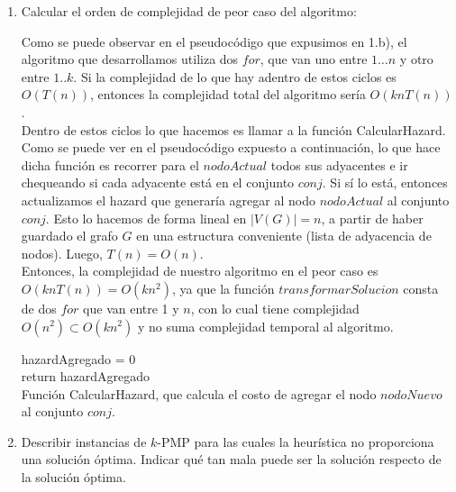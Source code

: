 \documentclass[11pt, a4paper, twoside]{article}
\begin{document}
\begin{enumerate}
		\item Calcular el orden de complejidad de peor caso del algoritmo:
		
		Como se puede observar en el pseudocódigo que expusimos en 1.b), el algoritmo que desarrollamos utiliza dos $for$, 
		que van uno entre $1 \dots n$ y otro entre $1..k$.
		Si la complejidad de lo que hay adentro de estos ciclos es $O(T(n))$, entonces la complejidad total
		del algoritmo sería $O(knT(n))$. \\
		Dentro de estos ciclos lo que hacemos es llamar a la función CalcularHazard. Como se puede ver en el pseudocódigo
		expuesto a continuación, lo que hace dicha función es
		recorrer para el $nodoActual$ todos sus adyacentes e ir chequeando si cada adyacente está en el conjunto $conj$. 
		Si sí lo está, entonces actualizamos el hazard que generaría agregar al nodo $nodoActual$ al conjunto $conj$. 
		Esto lo hacemos de forma lineal 
		en $|V(G)| = n $, a partir de haber guardado el grafo $G$ en una estructura conveniente (lista de adyacencia 
		de nodos). Luego, $T(n) = O(n)$. \\
		Entonces, la complejidad de nuestro algoritmo en el peor caso es $ O(knT(n)) = O(k n^2)$, ya que la función 
		$transformarSolucion$ consta de dos $for$ que van entre 1 y $n$, con lo cual tiene complejidad 
		$O(n^2) \subset O(k n^2) $ y no suma complejidad temporal al algoritmo.
		
		
		\begin{algorithm}[H]
		  hazardAgregado = 0 \\
		  return hazardAgregado \\
		\caption {Función CalcularHazard, que calcula el costo de agregar el nodo $nodoNuevo$ al conjunto $conj$.}
		\end{algorithm}
		
		
		\item Describir instancias de $k$-PMP para las cuales la heurística no proporciona una solución
		óptima. Indicar qué tan mala puede ser la solución respecto de la solución óptima.
		

\end{enumerate}
\end{document}
